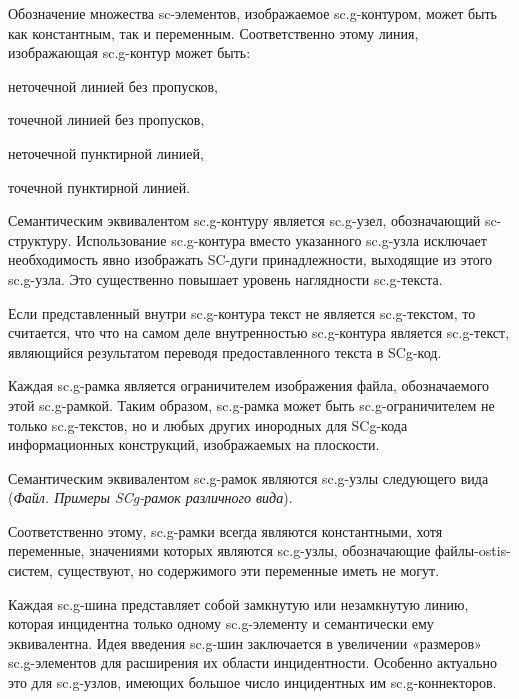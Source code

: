 \begin{SCn}
{Обозначение множества sc-элементов, изображаемое sc.g-контуром, может быть как константным, так и переменным. Соответственно этому линия, изображающая sc.g-контур может быть: 

\begin{scnitemize}
\item неточечной линией без пропусков,
\item точечной линией без пропусков,
\item неточечной пунктирной линией,
\item точечной пунктирной линией.
\end{scnitemize}

Семантическим эквивалентом sc.g-контуру является sc.g-узел, обозначающий sc-структуру. Использование sc.g-контура вместо указанного sc.g-узла исключает необходимость явно изображать SC-дуги принадлежности, выходящие из этого sc.g-узла. Это существенно повышает уровень наглядности sc.g-текста.

Если представленный внутри sc.g-контура текст не является sc.g-текстом, то считается, что что на самом деле внутренностью sc.g-контура является sc.g-текст, являющийся результатом переводя предоставленного текста в SCg-код.

Каждая sc.g-рамка является ограничителем изображения файла, обозначаемого этой sc.g-рамкой. Таким образом, sc.g-рамка может быть sc.g-ограничителем не только sc.g-текстов, но и любых других инородных для SCg-кода информационных конструкций, изображаемых на плоскости.

Семантическим эквивалентом sc.g-рамок являются sc.g-узлы следующего вида (\textit{Файл. Примеры SCg-рамок различного вида}).

Соответственно этому, sc.g-рамки всегда являются константными, хотя переменные, значениями которых являются sc.g-узлы, обозначающие файлы-ostis-систем, существуют, но  содержимого эти переменные иметь не могут.

Каждая sc.g-шина представляет собой замкнутую или незамкнутую линию, которая инцидентна только одному sc.g-элементу и семантически ему эквивалентна. Идея введения sc.g-шин заключается в увеличении «размеров» sc.g-элементов для расширения их области инцидентности. Особенно актуально это для sc.g-узлов, имеющих большое число инцидентных им sc.g-коннекторов.}


\scnendstruct



\end{SCn}
